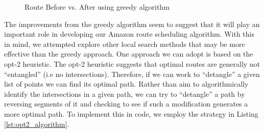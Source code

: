\documentclass[letterpaper]{article}
\begin{document}
    \begin{figure}[h]
        \caption{Route Before vs. After using greedy algorithm}
        \label{figure:greedy_method}
        \begin{minipage}{0.45\linewidth}
        \end{minipage}
        \begin{minipage}{0.5\linewidth}
        \end{minipage}

    \end{figure}

    The improvements from the greedy algorithm seem to suggest that it 
    will play an important role in developing our Amazon route scheduling 
    algorithm. With this in mind, we attempted explore other local search methods that may be more effective than the greedy approach. One approach we can adopt is based on the opt-2 
    heuristic. The opt-2 heuristic suggests that optimal routes are generally 
    not “entangled” (i.e no intersections). Therefore, if we can work to “detangle” 
    a given list of points we can find its optimal path. Rather than aim to algorithmically identify the intersections in a given path, 
    we can try to “detangle” a path by reversing segments of it and checking to 
    see if such a modification generates a more optimal path. To implement this in code, we employ the strategy in Listing \ref{lst:opt2_algorithm}.
\end{document}
